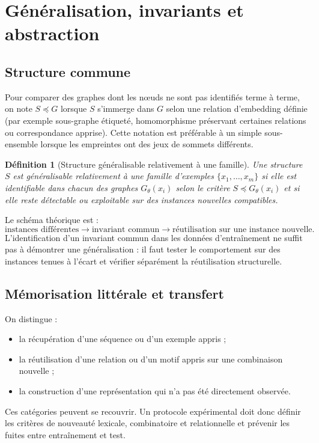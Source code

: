 \documentclass[11pt,a4paper]{article}
\newtheorem{definition}{Définition}[section]
\theoremstyle{remark}
\newcommand{\1}{\mathbf 1}
\begin{document}
\section{Généralisation, invariants et abstraction}

\subsection{Structure commune}
Pour comparer des graphes dont les nœuds ne sont pas identifiés terme à terme, on note $S\preccurlyeq G$ lorsque $S$ s'immerge dans $G$ selon une relation d'embedding définie (par exemple sous-graphe étiqueté, homomorphisme préservant certaines relations ou correspondance apprise). Cette notation est préférable à un simple sous-ensemble lorsque les empreintes ont des jeux de sommets différents.

\begin{definition}[Structure généralisable relativement à une famille]
Une structure $S$ est généralisable relativement à une famille d'exemples $\{x_1,\ldots,x_m\}$ si elle est identifiable dans chacun des graphes $G_\theta(x_i)$ selon le critère $S\preccurlyeq G_\theta(x_i)$ et si elle reste détectable ou exploitable sur des instances nouvelles compatibles.
\end{definition}

Le schéma théorique est :
\[
\text{instances différentes}\to\text{invariant commun}\to\text{réutilisation sur une instance nouvelle}.
\]
L'identification d'un invariant commun dans les données d'entraînement ne suffit pas à démontrer une généralisation : il faut tester le comportement sur des instances tenues à l'écart et vérifier séparément la réutilisation structurelle.

\subsection{Mémorisation littérale et transfert}
On distingue :
\begin{itemize}
  \item la récupération d'une séquence ou d'un exemple appris ;
  \item la réutilisation d'une relation ou d'un motif appris sur une combinaison nouvelle ;
  \item la construction d'une représentation qui n'a pas été directement observée.
\end{itemize}
Ces catégories peuvent se recouvrir. Un protocole expérimental doit donc définir les critères de nouveauté lexicale, combinatoire et relationnelle et prévenir les fuites entre entraînement et test.
\end{document}
